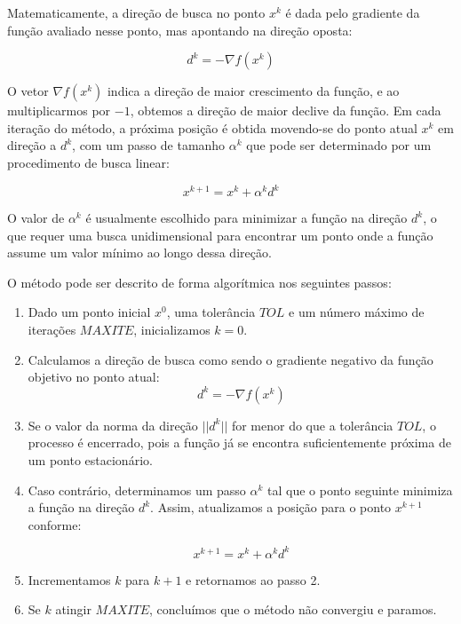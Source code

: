 \documentclass[a4paper, 12pt]{article}
\begin{document}
Matematicamente, a direção de busca no ponto $x^k$ é dada pelo gradiente da função avaliado nesse ponto, mas apontando na direção oposta:

\begin{equation}
d^k = - \nabla f(x^k)
\end{equation}

O vetor $\nabla f(x^k)$ indica a direção de maior crescimento da função, e ao multiplicarmos por $-1$, obtemos a direção de maior declive da função. Em cada iteração do método, a próxima posição é obtida movendo-se do ponto atual $x^k$ em direção a $d^k$, com um passo de tamanho $\alpha^k$ que pode ser determinado por um procedimento de busca linear:

\begin{equation}
x^{k+1} = x^k + \alpha^k d^k
\end{equation}

O valor de $\alpha^k$ é usualmente escolhido para minimizar a função na direção $d^k$, o que requer uma busca unidimensional para encontrar um ponto onde a função assume um valor mínimo ao longo dessa direção.

O método pode ser descrito de forma algorítmica nos seguintes passos:

\begin{enumerate}
\item Dado um ponto inicial $x^0$, uma tolerância $TOL$ e um número máximo de iterações $MAXITE$, inicializamos $k = 0$.
\item Calculamos a direção de busca como sendo o gradiente negativo da função objetivo no ponto atual:
\begin{equation}
    d^k = -\nabla f(x^k)
\end{equation}
\item Se o valor da norma da direção $||d^k||$ for menor do que a tolerância $TOL$, o processo é encerrado, pois a função já se encontra suficientemente próxima de um ponto estacionário.
\item Caso contrário, determinamos um passo $\alpha^k$ tal que o ponto seguinte minimiza a função na direção $d^k$. Assim, atualizamos a posição para o ponto $x^{k+1}$ conforme:

\begin{equation}
    x^{k+1} = x^k + \alpha^k d^k
\end{equation}
\item Incrementamos $k$ para $k + 1$ e retornamos ao passo 2.
\item Se $k$ atingir $MAXITE$, concluímos que o método não convergiu e paramos.
\end{enumerate}
\end{document}
